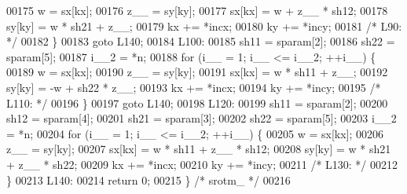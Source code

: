 \begin{DoxyCode}
00175     w = sx[kx];
00176     z\_\_ = sy[ky];
00177     sx[kx] = w + z\_\_ * sh12;
00178     sy[ky] = w * sh21 + z\_\_;
00179     kx += *incx;
00180     ky += *incy;
00181 \textcolor{comment}{/* L90: */}
00182     \}
00183     \textcolor{keywordflow}{goto} L140;
00184 L100:
00185     sh11 = sparam[2];
00186     sh22 = sparam[5];
00187     i\_\_2 = *n;
00188     \textcolor{keywordflow}{for} (i\_\_ = 1; i\_\_ <= i\_\_2; ++i\_\_) \{
00189     w = sx[kx];
00190     z\_\_ = sy[ky];
00191     sx[kx] = w * sh11 + z\_\_;
00192     sy[ky] = -w + sh22 * z\_\_;
00193     kx += *incx;
00194     ky += *incy;
00195 \textcolor{comment}{/* L110: */}
00196     \}
00197     \textcolor{keywordflow}{goto} L140;
00198 L120:
00199     sh11 = sparam[2];
00200     sh12 = sparam[4];
00201     sh21 = sparam[3];
00202     sh22 = sparam[5];
00203     i\_\_2 = *n;
00204     \textcolor{keywordflow}{for} (i\_\_ = 1; i\_\_ <= i\_\_2; ++i\_\_) \{
00205     w = sx[kx];
00206     z\_\_ = sy[ky];
00207     sx[kx] = w * sh11 + z\_\_ * sh12;
00208     sy[ky] = w * sh21 + z\_\_ * sh22;
00209     kx += *incx;
00210     ky += *incy;
00211 \textcolor{comment}{/* L130: */}
00212     \}
00213 L140:
00214     \textcolor{keywordflow}{return} 0;
00215 \} \textcolor{comment}{/* srotm\_ */}
00216 
\end{DoxyCode}
